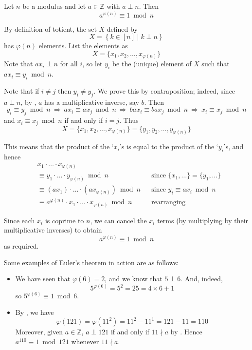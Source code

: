 \begin{theorem}
\label{thmEuler}
Let $n$ be a modulus and let $a \in \mathbb{Z}$ with $a \perp n$. Then
\[ a^{\varphi(n)} \equiv 1 \bmod n \]
\end{theorem}
\begin{cproof}
By definition of totient, the set $X$ defined by
\[ X = \left\{ k \in \left[n\right] \mid k \perp n \right\} \]
has $\varphi(n)$ elements. List the elements as
\[ X = \{ x_1, x_2, \dots, x_{\varphi(n)} \} \]
Note that $ax_i \perp n$ for all $i$, so let $y_i$ be the (unique) element of $X$ such that $ax_i \equiv y_i \bmod n$.

Note that if $i \ne j$ then $y_i \ne y_j$. We prove this by contraposition; indeed, since $a \perp n$, by , $a$ has a multiplicative inverse, say $b$. Then
\[ y_i \equiv y_j \bmod n\ \Rightarrow\ ax_i \equiv ax_j \bmod n\ \Rightarrow\ bax_i \equiv bax_j \bmod n\ \Rightarrow\ x_i \equiv x_j \bmod n \]
and $x_i \equiv x_j \bmod n$ if and only if $i=j$. Thus
\[ X = \{ x_1, x_2, \dots, x_{\varphi(n)} \} = \{ y_1, y_2, \dots, y_{\varphi(n)} \} \]

This means that the product of the `$x_i$'s is equal to the product of the `$y_i$'s, and hence
\begin{align*}
& x_1 \cdot {\dots} \cdot x_{\varphi(n)} &&
\\
&\equiv y_1 \cdot {\dots} \cdot y_{\varphi(n)} \bmod n && \text{since $\{ x_1, \dots \} = \{ y_1, \dots \}$} \\
&\equiv (ax_1) \cdot {\dots} \cdot (ax_{\varphi(n)}) \bmod n && \text{since $y_i \equiv ax_i \bmod n$}\\
&\equiv a^{\varphi(n)} \cdot x_1 \cdot {\dots} \cdot x_{\varphi(n)} \bmod n && \text{rearranging}
\end{align*}

Since each $x_i$ is coprime to $n$, we can cancel the $x_i$ terms (by multiplying by their multiplicative inverses) to obtain
\[ a^{\varphi(n)} \equiv 1 \bmod n \]
as required.
\end{cproof}

\begin{example}
Some examples of Euler's theorem in action are as follows:
\begin{itemize}
\item We have seen that $\varphi(6) = 2$, and we know that $5 \perp 6$. And, indeed,
\[ 5^{\varphi(6)} = 5^2 = 25 = 4 \times 6 + 1 \]
so $5^{\varphi(6)} \equiv 1 \bmod 6$.
\item By , we have
\[ \varphi(121) = \varphi(11^2) = 11^2-11^1 = 121-11 = 110 \]
Moreover, given $a \in \mathbb{Z}$, $a \perp 121$ if and only if $11 \nmid a$ by . Hence $a^{110} \equiv 1 \bmod{121}$ whenever $11 \nmid a$.
\end{itemize}
\end{example}

